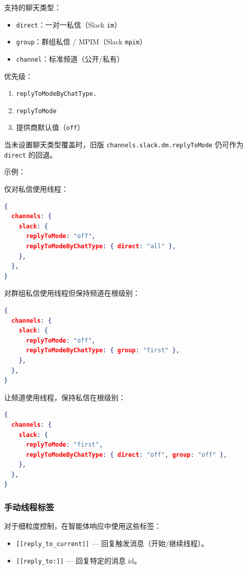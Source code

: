 支持的聊天类型：

\begin{itemize}
  \item \texttt{direct}：一对一私信（Slack \texttt{im}）
  \item \texttt{group}：群组私信 / MPIM（Slack \texttt{mpim}）
  \item \texttt{channel}：标准频道（公开/私有）
\end{itemize}


优先级：

\begin{enumerate}
  \item \texttt{replyToModeByChatType.}
  \item \texttt{replyToMode}
  \item 提供商默认值（\texttt{off}）
\end{enumerate}


当未设置聊天类型覆盖时，旧版 \texttt{channels.slack.dm.replyToMode} 仍可作为 \texttt{direct} 的回退。

示例：

仅对私信使用线程：

\begin{lstlisting}[language=json]
{
  channels: {
    slack: {
      replyToMode: "off",
      replyToModeByChatType: { direct: "all" },
    },
  },
}
\end{lstlisting}


对群组私信使用线程但保持频道在根级别：

\begin{lstlisting}[language=json]
{
  channels: {
    slack: {
      replyToMode: "off",
      replyToModeByChatType: { group: "first" },
    },
  },
}
\end{lstlisting}


让频道使用线程，保持私信在根级别：

\begin{lstlisting}[language=json]
{
  channels: {
    slack: {
      replyToMode: "first",
      replyToModeByChatType: { direct: "off", group: "off" },
    },
  },
}
\end{lstlisting}


\subsubsection{手动线程标签}


对于细粒度控制，在智能体响应中使用这些标签：

\begin{itemize}
  \item \texttt{[[reply\_to\_current]]} — 回复触发消息（开始/继续线程）。
  \item \texttt{[[reply\_to:]]} — 回复特定的消息 id。
\end{itemize}



